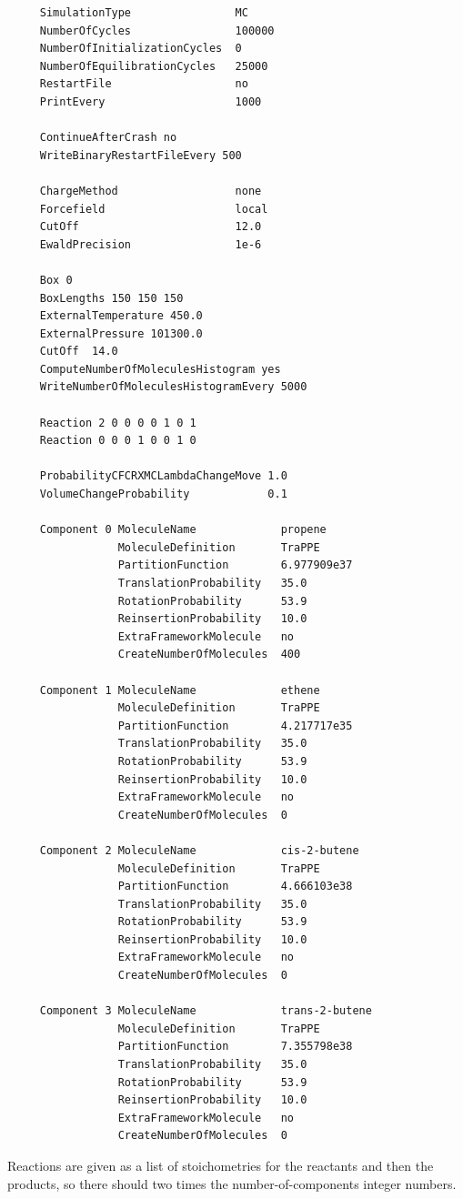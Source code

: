 \begin{tiny}
\begin{verbatim}
     SimulationType                MC
     NumberOfCycles                100000
     NumberOfInitializationCycles  0
     NumberOfEquilibrationCycles   25000
     RestartFile                   no
     PrintEvery                    1000
     
     ContinueAfterCrash no
     WriteBinaryRestartFileEvery 500
     
     ChargeMethod                  none
     Forcefield                    local
     CutOff                        12.0
     EwaldPrecision                1e-6
     
     Box 0
     BoxLengths 150 150 150
     ExternalTemperature 450.0
     ExternalPressure 101300.0
     CutOff  14.0
     ComputeNumberOfMoleculesHistogram yes
     WriteNumberOfMoleculesHistogramEvery 5000
     
     Reaction 2 0 0 0 0 1 0 1
     Reaction 0 0 0 1 0 0 1 0
     
     ProbabilityCFCRXMCLambdaChangeMove 1.0
     VolumeChangeProbability            0.1
     
     Component 0 MoleculeName             propene
                 MoleculeDefinition       TraPPE
                 PartitionFunction        6.977909e37
                 TranslationProbability   35.0
                 RotationProbability      53.9
                 ReinsertionProbability   10.0
                 ExtraFrameworkMolecule   no
                 CreateNumberOfMolecules  400
     
     Component 1 MoleculeName             ethene
                 MoleculeDefinition       TraPPE
                 PartitionFunction        4.217717e35
                 TranslationProbability   35.0
                 RotationProbability      53.9
                 ReinsertionProbability   10.0
                 ExtraFrameworkMolecule   no
                 CreateNumberOfMolecules  0
     
     Component 2 MoleculeName             cis-2-butene
                 MoleculeDefinition       TraPPE
                 PartitionFunction        4.666103e38
                 TranslationProbability   35.0
                 RotationProbability      53.9
                 ReinsertionProbability   10.0
                 ExtraFrameworkMolecule   no
                 CreateNumberOfMolecules  0
     
     Component 3 MoleculeName             trans-2-butene
                 MoleculeDefinition       TraPPE
                 PartitionFunction        7.355798e38
                 TranslationProbability   35.0
                 RotationProbability      53.9
                 ReinsertionProbability   10.0
                 ExtraFrameworkMolecule   no
                 CreateNumberOfMolecules  0
\end{verbatim}
\end{tiny}
Reactions are given as a list of stoichometries for the reactants and then the products, so there should two times the number-of-components integer numbers.

